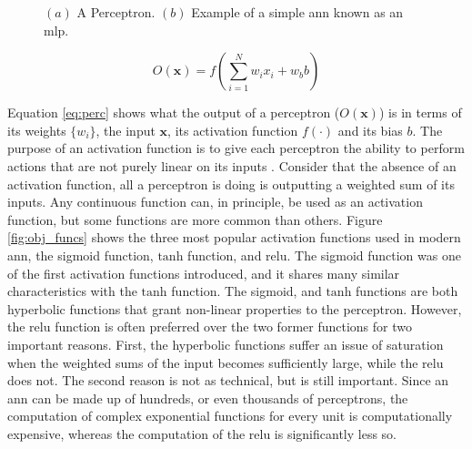 \begin{figure}[H]
\begin{center}
    
\end{center}
\caption{$(a)$ A Perceptron. $(b)$ Example of a simple \acrshort{ann} known as an \acrshort{mlp}.} 
\label{fig:perc_nn}
\end{figure}

\begin{equation}
    O(\mathbf{x}) = f \left ( \sum_{i = 1}^N w_i x_i + w_b b\right )
    \label{eq:perc}
\end{equation}

Equation \eqref{eq:perc} shows what the output of a perceptron ($O(\mathbf{x})$) is in terms of its weights $\{w_i\}$, the input $\mathbf{x}$, its activation function $f(\cdot)$ and its bias $b$. The purpose of an activation function is to give each perceptron the ability to perform actions that are not purely linear on its inputs \cite{dl_book}. Consider that the absence of an activation function, all a perceptron is doing is outputting a weighted sum of its inputs. Any continuous function can, in principle, be used as an activation function, but some functions are more common than others. Figure \ref{fig:obj_funcs} shows the three most popular activation functions used in modern \acrshort{ann}, the sigmoid function, $\mathrm{tanh}$ function, and \acrfull{relu}. The sigmoid function was one of the first activation functions introduced, and it shares many similar characteristics with the $\mathrm{tanh}$ function. The sigmoid, and $\mathrm{tanh}$ functions are both hyperbolic functions that grant non-linear properties to the perceptron. However, the \acrshort{relu} function is often preferred over the two former functions for two important reasons. First, the hyperbolic functions suffer an issue of saturation when the weighted sums of the input becomes sufficiently large, while the \acrshort{relu} does not. The second reason is not as technical, but is still important. Since an \acrshort{ann} can be made up of hundreds, or even thousands of perceptrons, the computation of complex exponential functions for every unit is computationally expensive, whereas the computation of the \acrshort{relu} is significantly less so. 

